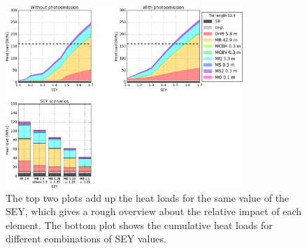 \begin{figure}[tbh]
    \centering
    \includegraphics[width=0.8\textwidth]{../plots/summed_hl_1.png}
    \caption{The top two plots add up the heat loads for the same value of the SEY, which gives a rough overview about the relative impact of each element.
    The bottom plot shows the cumulative heat loads for different combinations of SEY values.
    }
    \label{fig:summed_hl}
\end{figure}

